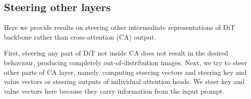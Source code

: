 





\clearpage
\subsection{Steering other layers}
\label{ablation_other_layers}

Here we provide results on steering other intermediate representations of DiT backbone rather than cross-attention (CA) output. 

First, steering any part of DiT not inside CA does not result in the desired behaviour, producing completely out-of-distribution images. Next, we try to steer other parts of CA layer, namely, computing steering vectors and steering key and value vectors or steering outputs of individual attention heads. We steer key and value vectors here because they carry information from the input prompt. 

